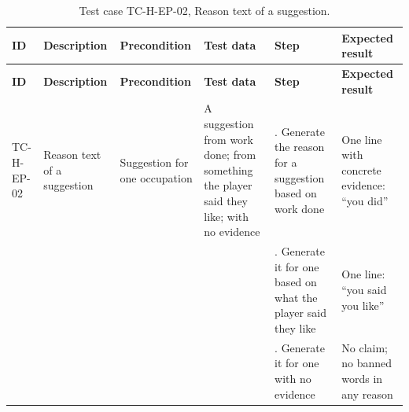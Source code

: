 {\footnotesize{}\renewcommand{\arraystretch}{1.1}
\begin{longtable}{|>{\raggedright\arraybackslash}p{}|>{\raggedright\arraybackslash}p{}|>{\raggedright\arraybackslash}p{}|>{\raggedright\arraybackslash}p{}|>{\raggedright\arraybackslash}p{}|>{\raggedright\arraybackslash}p{}|}
\caption{Test case TC-H-EP-02, Reason text of a suggestion.} \\
\hline
\textbf{ID} & \textbf{Description} & \textbf{Precondition} & \textbf{Test data} & \textbf{Step} & \textbf{Expected result} \\ \hline
\endfirsthead
\hline
\textbf{ID} & \textbf{Description} & \textbf{Precondition} & \textbf{Test data} & \textbf{Step} & \textbf{Expected result} \\ \hline
\endhead
TC-H-EP-02 & Reason text of a suggestion & Suggestion for one occupation & A suggestion from work done; from something the player said they like; with no evidence & 1. Generate the reason for a suggestion based on work done & One line with concrete evidence: ``you did'' \\ \cline{5-6}
 &  &  &  & 2. Generate it for one based on what the player said they like & One line: ``you said you like'' \\ \cline{5-6}
 &  &  &  & 3. Generate it for one with no evidence & No claim; no banned words in any reason \\ \hline
\end{longtable}
}


